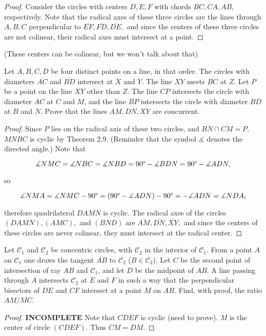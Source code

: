 \documentclass[letterpaper,oneside]{scrartcl}
\begin{document}
\begin{proof}  Consider the circles with centers $D,E,F$ with chords $BC, CA, AB,$ respectively. Note that the radical axes of these three circles are the lines through $A,B,C$ perpendicular to $\overline{EF}, \overline{FD}, \overline{DE},$ and since the centers of these three circles are not colinear, their radical axes must intersect at a point. \end{proof} (These centers  can  be colinear, but we won't talk about that)

\begin{problem*}
  [2.31, IMO 1995/1]
  Let  $A, B, C, D$ be four distinct points on a line, in that order. The circles with diameters $\overline{AC}$ and $\overline{BD}$ intersect at $X$ and $Y.$ The line $XY$ meets $\overline{BC}$ at $Z.$ Let $P$ be a point on the line $XY$ other than $Z$. The line $CP$ intersects the circle with diameter $AC$ at $C$ and $M$, and the line $BP$ intersects the circle with diameter $BD$ at $B$ and $N$. Prove that the lines $AM, DN, XY$ are concurrent.
\end{problem*}

\begin{proof}  Since $P$ lies on the radical axis of these two circles, and $\overline{BN} \cap \overline{CM} =P,$ $MNBC$ is cyclic by Theorem 2.9. (Reminder that the symbol $\measuredangle$ denotes the directed angle.) Note that

  $$\measuredangle NMC = \measuredangle NBC = \measuredangle NBD = 90\degree - \measuredangle BDN =  90\degree - \measuredangle ADN,$$

  so

  $$\measuredangle NMA =   \measuredangle NMC -90\degree = (90\degree - \measuredangle ADN) - 90\degree = -\measuredangle ADN = \measuredangle NDA,$$

  therefore quadrilateral $DAMN$ is cyclic. The radical axes of the circles $(DAMN), (AMC),$ and $(BND)$ are $\overline{AM}, \overline{DN}, \overline{XY},$ and since the centers of these circles are never colinear, they must intersect at the radical center.
\end{proof}

\begin{problem*}
  [2.32, USAMO 1998/2]
  Let $\mathcal{C}_1$ and $\mathcal{C}_2$ be concentric circles, with $\mathcal{C}_2$ in the interior of $\mathcal{C}_1$. From a point $A$ on $\mathcal{C}_1$ one draws the tangent $\overline{AB}$ to $\mathcal{C}_2$  ($B \in  \mathcal{C}_2$). Let $C$ be the second point of intersection of ray $AB$ and $\mathcal{C}_1$, and let $D$ be the midpoint of $\overline{AB}$. A line passing through $A$ intersects $\mathcal{C}_2$ at $E$ and $F$ in such a way that the perpendicular bisectors of $DE$ and $CF$ intersect at a point $M$ on $AB$. Find, with proof, the ratio $AM/MC$.
\end{problem*}
\begin{proof}  \textbf{INCOMPLETE}
  Note that $CDEF$ is cyclic (need to prove). $M$ is the center of circle $(CDEF).$ Thus $CM=DM.$
\end{proof}
\newpage
\end{document}
